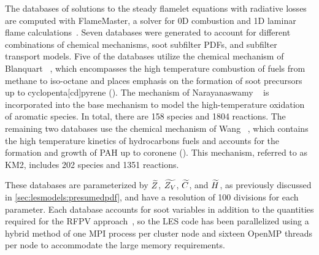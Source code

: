 The databases of solutions to the steady flamelet equations with radiative losses are computed with FlameMaster, a solver for 0D combustion and 1D laminar flame calculations~\cite{flamemaster}. Seven databases were generated to account for different combinations of chemical mechanisms, soot subfilter PDFs, and subfilter transport models. Five of the databases utilize the chemical mechanism of Blanquart \etal~\cite{blanquart2009588}, which encompasses the high temperature combustion of fuels from methane to iso-octane and places emphasis on the formation of soot precursors up to cyclopenta[cd]pyrene (). The mechanism of Narayanaswamy \etal~\cite{narayanaswamy2010} is incorporated into the base mechanism to model the high-temperature oxidation of aromatic species. In total, there are 158 species and 1804 reactions. The remaining two databases use the chemical mechanism of Wang \etal~\cite{wang2013}, which contains the high temperature kinetics of  hydrocarbons fuels and accounts for the formation and growth of PAH up to coronene (). This mechanism, referred to as KM2, includes 202 species and 1351 reactions.

These databases are parameterized by $\widetilde{Z}$, $\widetilde{Z_V}$, $\widetilde{C}$, and $\widetilde{H}$, as previously discussed in \cref{sec:lesmodels:presumedpdf}, and have a resolution of 100 divisions for each parameter. Each database accounts for soot variables in addition to the quantities required for the RFPV approach~\cite{ihme2008}, so the LES code has been parallelized using a hybrid method of one MPI process per cluster node and sixteen OpenMP threads per node to accommodate the large memory requirements.
